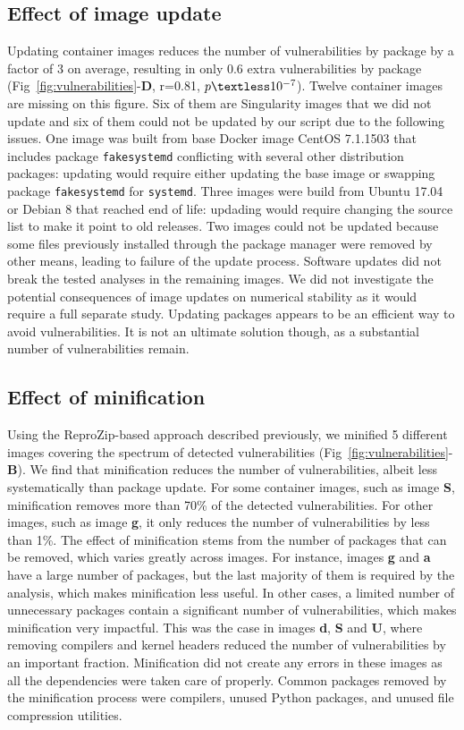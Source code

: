 \documentclass[a4paper,num-refs]{oup-contemporary}
\newcommand{\revision}[1]{\color{ao(english)}#1\color{black}\xspace}
\begin{document}
\subsection{Effect of image update}

Updating container images reduces the number of vulnerabilities by package
by a factor of 3 on average, resulting in only 0.6 extra vulnerabilities by
package (Fig~\ref{fig:vulnerabilities}-\textbf{D}, r=0.81,
$p\textless10^{-7}$). Twelve container images are missing on this figure.
Six of them are Singularity images that we did not update and six of them
\revision{could not be updated by our script due to the following issues.
One image was built from base Docker image CentOS 7.1.1503 that includes
package \texttt{fakesystemd} conflicting with several other distribution
packages: updating would require either updating the base image or swapping
package \texttt{fakesystemd} for \texttt{systemd}. Three images were build
from Ubuntu 17.04 or Debian 8 that reached end of life: updading would
require changing the source list to make it point to old releases. Two
images could not be updated because some files previously installed through
the package manager were removed by other means, leading to failure of the
update process.}
\revision{Software updates did not break the tested
analyses in the remaining images. We did not investigate the potential consequences of image updates
on numerical stability as it would require a full separate study. Updating}
packages appears to be an efficient way to avoid vulnerabilities. It
is not an ultimate solution though, as a substantial number of
vulnerabilities remain.

\subsection{Effect of minification}

Using the ReproZip-based approach described previously, we minified 5
different images covering the spectrum of detected vulnerabilities
(Fig~\ref{fig:vulnerabilities}-\textbf{B}). We find that minification reduces the
number of vulnerabilities, albeit less systematically than package update.
For some container images, such as image \textbf{S}, minification removes more
than 70\% of the detected vulnerabilities. For other images, such as
image \textbf{g}, it only reduces the number of vulnerabilities by less than 1\%.
The effect of minification stems from the number of packages
that can be removed, which varies greatly across images. For
instance, images \textbf{g} and \textbf{a} have a large number of packages,
but the last majority of them is required by the analysis, which makes
minification less useful. In other cases, a limited number of unnecessary packages contain 
a significant number of vulnerabilities, which makes minification very impactful. 
This was the case in images \textbf{d}, \textbf{S} and \textbf{U}, where removing compilers
and kernel headers reduced the number of vulnerabilities by an important fraction. 
\revision{Minification did not create any errors in these images as all the
dependencies were taken care of properly. Common packages removed by the
minification process were compilers, unused Python packages, and unused
file compression utilities.}
\end{document}
